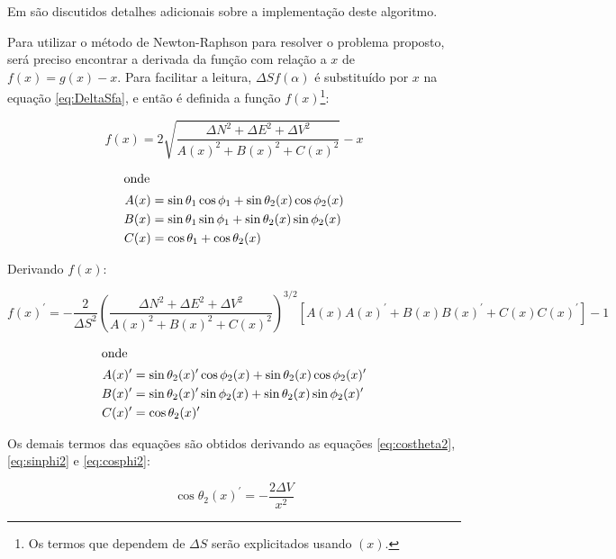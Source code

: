 \documentclass[final,3p,12pt]{elsarticle}
\begin{document}
Em \cite{relatoriobisseccao} são discutidos detalhes adicionais sobre a implementação deste algoritmo.

Para utilizar o método de Newton-Raphson para resolver o problema proposto, será preciso encontrar a derivada da função com relação a $x$ de $f(x) = g(x) - x$. Para facilitar a leitura, $\Delta S f(\alpha)$ é substituído por $x$ na equação \ref{eq:DeltaSfa}, e então é definida a função $f(x)$\footnote{Os termos que dependem de $\Delta S$ serão explicitados usando $(x)$.}:

\begin{equation} \label{eq:fx}
    f(x) = 2 \sqrt{\frac{\Delta N^2 + \Delta E^2 + \Delta V^2}{A(x)^2+B(x)^2+C(x)^2}} - x
\end{equation}

\begin{align*}
    \intertext{onde}
    A(x) &= \sin \theta_1 \cos \phi_1 + \sin \theta_2(x) \cos \phi_2(x) \\
    B(x) &= \sin \theta_1 \sin \phi_1 + \sin \theta_2(x) \sin \phi_2(x) \\
    C(x) &= \cos \theta_1 + \cos \theta_2(x)
\end{align*}

Derivando $f(x)$:

\begin{equation} \label{eq:fxprime}
    f(x)^{\prime} = - \frac{2}{\Delta S^2} \left( \frac{ \Delta N^2 + \Delta E^2 + \Delta V^2}{A(x)^2+B(x)^2+C(x)^2} \right) ^{3/2} [A(x)A(x)^{\prime}+B(x)B(x)^{\prime}+C(x)C(x)^{\prime}] - 1
\end{equation}

\begin{align*}
    \intertext{onde}
    A(x)^{\prime} &= \sin \theta_2(x)^{\prime} \cos \phi_2(x) + \sin \theta_2(x) \cos \phi_2(x)^{\prime} \\
    B(x)^{\prime} &= \sin \theta_2(x)^{\prime} \sin \phi_2(x) + \sin \theta_2(x) \sin \phi_2(x)^{\prime} \\
    C(x)^{\prime} &= \cos \theta_2(x)^{\prime}
\end{align*}

Os demais termos das equações são obtidos derivando as equações \ref{eq:costheta2}, \ref{eq:sinphi2} e \ref{eq:cosphi2}:

\begin{equation} \label{eq:costheta2prime}
    \cos \theta_2(x)^{\prime} = - \frac{2 \Delta V}{x^2} 
\end{equation}
\end{document}
